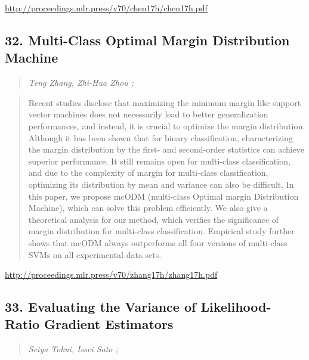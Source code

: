 \documentclass{article}
\begin{document}
\href{http://proceedings.mlr.press/v70/chen17h/chen17h.pdf}{http://proceedings.mlr.press/v70/chen17h/chen17h.pdf}

\subsection{32. Multi-Class Optimal Margin Distribution Machine}

\begin{quote}
\footnotesize{\textit{Teng Zhang, Zhi-Hua Zhou ;}}

\end{quote}

\begin{quote}
    Recent studies disclose that maximizing the minimum margin like support vector machines does not necessarily lead to better generalization performances, and instead, it is crucial to optimize the margin distribution. Although it has been shown that for binary classification, characterizing the margin distribution by the first- and second-order statistics can achieve superior performance. It still remains open for multi-class classification, and due to the complexity of margin for multi-class classification, optimizing its distribution by mean and variance can also be difficult. In this paper, we propose mcODM (multi-class Optimal margin Distribution Machine), which can solve this problem efficiently. We also give a theoretical analysis for our method, which verifies the significance of margin distribution for multi-class classification. Empirical study further shows that mcODM always outperforms all four versions of multi-class SVMs on all experimental data sets.  
\end{quote}

\href{http://proceedings.mlr.press/v70/zhang17h/zhang17h.pdf}{http://proceedings.mlr.press/v70/zhang17h/zhang17h.pdf}

\subsection{33. Evaluating the Variance of Likelihood-Ratio Gradient Estimators}

\begin{quote}
\footnotesize{\textit{Seiya Tokui, Issei Sato ;}}

\end{quote}
\end{document}
